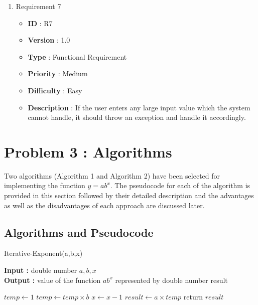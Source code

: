 \documentclass[12pt, a4paper]{article}
\begin{document}
\begin{enumerate}
    \newpage
    
    \item{} Requirement 7
        \begin{itemize}
        \item \textbf{ID} : R7
        \item \textbf{Version} : 1.0
        \item \textbf{Type} : Functional Requirement
        \item \textbf{Priority} : Medium
        \item \textbf{Difficulty} : Easy
        \item \textbf{Description} : If the user enters any large input value which the system cannot handle, it should throw an exception and handle it accordingly.
        \end{itemize}
\end{enumerate}

\newpage

\section{Problem 3 : Algorithms}

Two algorithms (Algorithm 1 and Algorithm 2) have been selected for \newline
implementing the function $y = ab^x $. The pseudocode for each of the algorithm is provided in this section followed by their detailed description and the advantages as well as the disadvantages of each approach are discussed later.

\subsection{Algorithms and Pseudocode}
\begin{algorithm}[hbt!]
\caption{Iterative-Exponent(a,b,x)}\label{alg:one}

\hspace*{\algorithmicindent} \textbf{Input : }double number $a,b,x$ \\
\hspace*{\algorithmicindent} \textbf{Output : }value of the function $ab^x$ represented by double number result
\begin{algorithmic}[1]
\STATE $temp \gets 1$
  \STATE $temp \gets temp \times b$
  \STATE $x \gets x - 1$
\ENDWHILE
\STATE $result \gets a \times temp$
\STATE return $result$
\end{algorithmic}
\end{algorithm}
\end{document}
